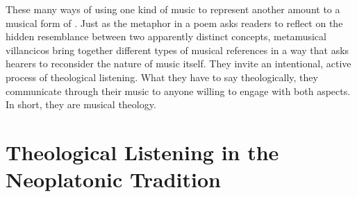
These many ways of using one kind of music to represent another amount to a
musical form of .
Just as the metaphor in a  poem asks readers to reflect
on the hidden resemblance between two apparently distinct concepts, metamusical
villancicos bring together different types of musical references in a way that
asks hearers to reconsider the nature of music itself.
They invite an intentional, active process of theological listening.
What they have to say theologically, they communicate through their music to
anyone willing to engage with both aspects.
In short, they are musical theology.


\section{Theological Listening in the Neoplatonic Tradition}

